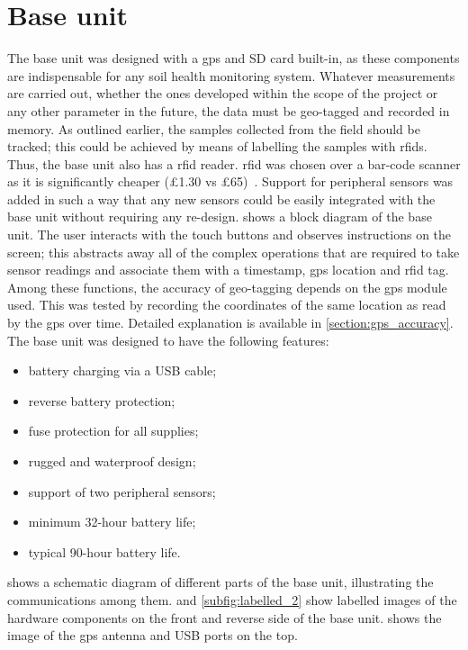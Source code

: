 \section{Base unit}

The base unit was designed with a \gls{gps} and SD card built-in, as these components are indispensable for any soil health monitoring system. Whatever measurements are carried out, whether the ones developed within the scope of the project or any other parameter in the future, the data must be geo-tagged and recorded in memory. As outlined earlier, the samples collected from the field should be tracked; this could be achieved by means of labelling the samples with \gls{rfid}s. Thus, the base unit also has a \gls{rfid} reader. \gls{rfid} was chosen over a bar-code scanner as it is significantly cheaper (\pounds 1.30 vs \pounds 65)~\cite{JM_barcode}. Support for peripheral sensors was added in such a way that any new sensors could be easily integrated with the base unit without requiring any re-design.  shows a block diagram of the base unit. The user interacts with the touch buttons and observes instructions on the screen; this abstracts away all of the complex operations that are required to take sensor readings and associate them with a timestamp, \gls{gps} location and \gls{rfid} tag. Among these functions, the accuracy of geo-tagging depends on the \gls{gps} module used. This was tested by recording the coordinates of the same location as read by the \gls{gps} over time. Detailed explanation is available in \cref{section:gps_accuracy}. \\

The base unit was designed to have the following features: 

\begin{itemize}
    \item battery charging via a \gls{USB} cable;
    \item reverse battery protection;
    \item fuse protection for all supplies;  
    \item rugged and waterproof design; 
    \item support of two peripheral sensors; 
    \item minimum 32-hour battery life;
    \item typical 90-hour battery life.
\end{itemize}

 shows a schematic diagram of different parts of the base unit, illustrating the communications among them. %
 and \ref{subfig:labelled_2} show labelled images of the hardware components on the front and reverse side of the base unit.  shows the image of the \gls{gps} antenna and \gls{USB} ports on the top.

